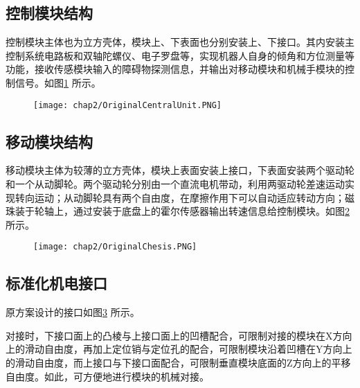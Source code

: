 \subsection{控制模块结构}
控制模块主体也为立方壳体，模块上、下表面也分别安装上、下接口。其内安装主控制系统电路板和双轴陀螺仪、电子罗盘等，实现机器人自身的倾角和方位测量等功能，接收传感模块输入的障碍物探测信息，并输出对移动模块和机械手模块的控制信号。如图\ref{fig.CentralUnit} 所示。
\begin{figure}[!htp]\label{fig.CentralUnit}
  \centering
  \texttt{[image: chap2/OriginalCentralUnit.PNG]}
\end{figure}
\subsection{移动模块结构}
移动模块主体为较薄的立方壳体，模块上表面安装上接口，下表面安装两个驱动轮和一个从动脚轮。两个驱动轮分别由一个直流电机带动，利用两驱动轮差速运动实现转向运动；从动脚轮具有两个自由度，在摩擦作用下可以自动适应转动方向；磁珠装于轮轴上，通过安装于底盘上的霍尔传感器输出转速信息给控制模块。如图\ref{fig.ChesisOld} 所示。
\begin{figure}[!htp]\label{fig.ChesisOld}
  \centering
  \texttt{[image: chap2/OriginalChesis.PNG]}
\end{figure}
\subsection{标准化机电接口}
原方案设计的接口如图\ref{fig.OriginalPort} 所示。
\begin{figure}\label{fig.OriginalPort}
  \centering
\end{figure}
对接时，下接口面上的凸棱与上接口面上的凹槽配合，可限制对接的模块在X方向上的滑动自由度，再加上定位销与定位孔的配合，可限制模块沿着凹槽在Y方向上的滑动自由度，而上接口与下接口面配合，可限制垂直模块底面的Z方向上的平移自由度。如此，可方便地进行模块的机械对接。

